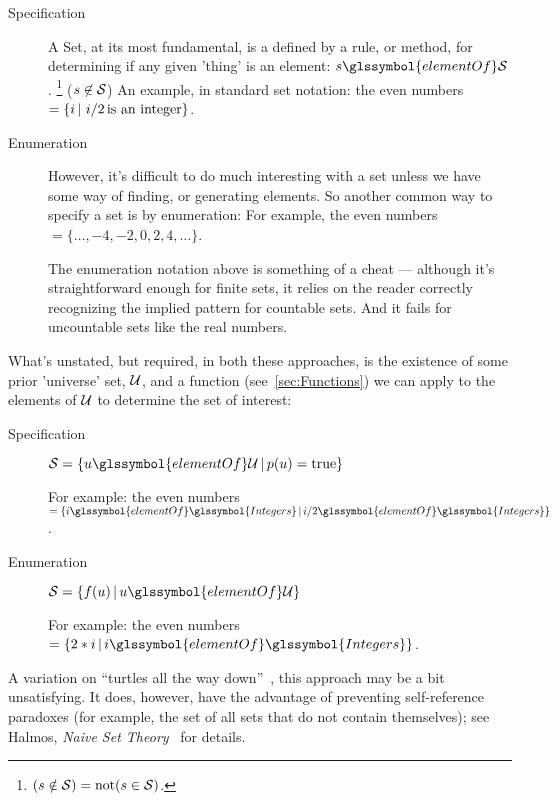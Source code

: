 \begin{description}

\item[Specification]

A \gls{Set}, at its most fundamental, is a defined by a rule,
or method,
for determining if any given 'thing' is an element: 
$s \glssymbol{elementOf} \Set{S}$.
\footnote{$(s \notin \mathcal{S}) = \text{not}(s \in \mathcal{S})$.}
($s \not\in \mathcal{S}$)
An example, in standard set notation:
the even numbers 
$=  \left\{  i  \, | \,  \, i/2 \, \text{is an integer}  \right\} $.

\item[Enumeration]

However, it's difficult to do much interesting with a set
unless we have some way of finding, or generating elements.
So another common way to specify a set is by enumeration:
For example, the even numbers $= \{ \ldots, -4, -2, 0, 2 ,4,
\ldots \}$.

The enumeration notation above is something of a cheat ---
although it's straightforward enough for finite sets, it relies on
the reader correctly recognizing the implied pattern for countable
sets.
And it fails for uncountable sets like the real numbers.

\end{description}

What's unstated, but required, in both these approaches, is the
existence of some prior 'universe' set, $\mathcal{U}$, and a function
(see~\autoref{sec:Functions}) we can apply to the elements of
$\mathcal{U}$ to determine the set of interest:

\begin{description}
\item[Specification] 
$\Set{S} =
\SetSpec{ u \glssymbol{elementOf} \Set{U} }{ p(u) = \text{true} }$ 

For example: the even numbers
 $= \SetSpec{ i \glssymbol{elementOf} 
\glssymbol{Integers} }{
 i/2 \glssymbol{elementOf} \glssymbol{Integers} }$.

\item[Enumeration]
$\Set{S} =
\SetSpec{ f(u) }{ u \glssymbol{elementOf} \Set{U} }$ 

For example: the even numbers 
$= \SetSpec{ 2*i }{ i \glssymbol{elementOf} \glssymbol{Integers} }$.

\end{description}
A variation on 
``turtles all the way down''~\cite{Munroe:2014:XKCDTurtles, wiki:Turtles},
this approach may be a bit unsatisfying.
It does, however, have the advantage of preventing self-reference
paradoxes (for example, 
the set of all sets that do not contain themselves); 
see Halmos, 
\textit{Naive Set Theory}~\cite[section 2]{Halmos1960Naive} 
for details.

